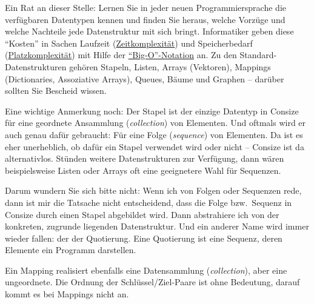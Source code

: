 Ein Rat an dieser Stelle: Lernen Sie in jeder neuen Programmiersprache die verfügbaren Datentypen kennen und finden Sie heraus, welche Vorzüge und welche Nachteile jede Datenstruktur mit sich bringt. Informatiker geben diese "`Kosten"' in Sachen Laufzeit (\href{http://de.wikipedia.org/wiki/Zeitkomplexit\%C3\%A4t}{Zeitkomplexität}) und Speicherbedarf (\href{http://de.wikipedia.org/wiki/Platzkomplexit\%C3\%A4t}{Platzkomplexität})
mit Hilfe der \href{http://en.wikipedia.org/wiki/Big\_O\_notation}{"`Big-O"'-Notation} an.
Zu den Standard-Datenstrukturen gehören Stapeln, Listen, Arrays (Vektoren), Mappings (Dictionaries, Assoziative Arrays), Queues, Bäume und Graphen -- darüber sollten Sie Bescheid wissen. 


Eine wichtige Anmerkung noch: Der Stapel ist der einzige Datentyp in Consize für eine geordnete Ansammlung (\emph{collection}) von Elementen. Und oftmals wird er auch genau dafür gebraucht: Für eine Folge (\emph{sequence}) von Elementen. Da ist es eher unerheblich, ob dafür ein Stapel verwendet wird oder nicht -- Consize ist da alternativlos. Stünden weitere Datenstrukturen zur Verfügung, dann wären beispielsweise Listen oder Arrays oft eine geeignetere Wahl für Sequenzen.

Darum wundern Sie sich bitte nicht: Wenn ich von Folgen oder Sequenzen rede, dann ist mir die Tatsache nicht entscheidend, dass die Folge bzw.\ Sequenz in Consize durch einen Stapel abgebildet wird. Dann abstrahiere ich von der konkreten, zugrunde liegenden Datenstruktur. Und ein anderer Name wird immer wieder fallen: der der Quotierung. Eine Quotierung ist eine Sequenz, deren Elemente ein Programm darstellen.

Ein Mapping realisiert ebenfalls eine Datensammlung (\emph{collection}), aber eine ungeordnete. Die Ordnung der Schlüssel/Ziel-Paare ist ohne Bedeutung, darauf kommt es bei Mappings nicht an.
